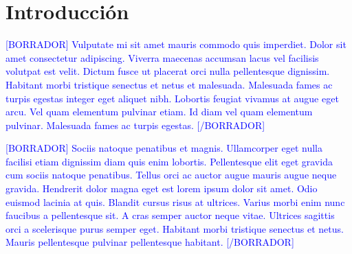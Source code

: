 
\newpage
\clearpage{\pagestyle{empty}\cleardoublepage}
\newpage

\chapter*{\centering \large Introducción} 

\textcolor{blue}{[BORRADOR] Vulputate mi sit amet mauris commodo quis imperdiet. Dolor sit amet consectetur adipiscing. Viverra maecenas accumsan lacus vel facilisis volutpat est velit. Dictum fusce ut placerat orci nulla pellentesque dignissim. Habitant morbi tristique senectus et netus et malesuada. Malesuada fames ac turpis egestas integer eget aliquet nibh. Lobortis feugiat vivamus at augue eget arcu. Vel quam elementum pulvinar etiam. Id diam vel quam elementum pulvinar. Malesuada fames ac turpis egestas.  [/BORRADOR]} 

\textcolor{blue}{[BORRADOR] Sociis natoque penatibus et magnis. Ullamcorper eget nulla facilisi etiam dignissim diam quis enim lobortis. Pellentesque elit eget gravida cum sociis natoque penatibus. Tellus orci ac auctor augue mauris augue neque gravida. Hendrerit dolor magna eget est lorem ipsum dolor sit amet. Odio euismod lacinia at quis. Blandit cursus risus at ultrices. Varius morbi enim nunc faucibus a pellentesque sit. A cras semper auctor neque vitae. Ultrices sagittis orci a scelerisque purus semper eget. Habitant morbi tristique senectus et netus. Mauris pellentesque pulvinar pellentesque habitant. [/BORRADOR]}

 